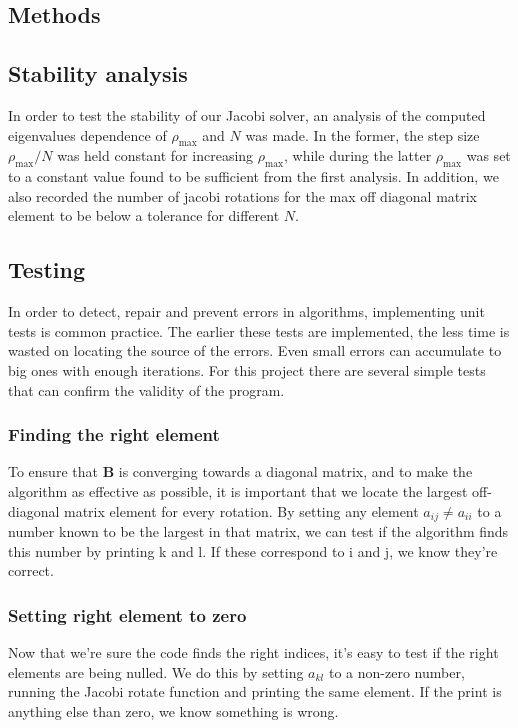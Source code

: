 \documentclass[10pt]{article}
\newcommand{\rhomax}{\rho_{\text{max}}}
\begin{document}
\begin{multicols}{2}
\section{Methods}
\subsection{Stability analysis}
In order to test the stability of our Jacobi solver, an analysis of the
computed eigenvalues dependence of $\rhomax$ and $N$ was made. In the
former, the step size $\rhomax/N$ was held constant for increasing
$\rhomax$, while during the latter $\rhomax$ was set to a constant value
found to be sufficient from the first analysis. In addition, we also
recorded the number of
jacobi rotations for the max off diagonal matrix element to be below a
tolerance for different $N$.

\subsection{Testing}
In order to detect, repair and prevent errors in algorithms, implementing
unit tests is common practice. The earlier these tests are implemented, the
less time is wasted on locating the source of the errors. Even small errors
can accumulate to big ones with enough iterations. For this project there
are several simple tests that can confirm the validity of the program.  

\subsubsection{Finding the right element}
To ensure that $\textbf{B}$ is converging towards a diagonal matrix, and to
make the algorithm as effective as possible, it is important that we locate
the largest off-diagonal matrix element for every rotation. By setting any
element $a_{ij}\neq a_{ii}$ to a number known to be the largest in that
matrix, we can test if the algorithm finds this number by printing k and l.
If these correspond to i and j, we know they're correct.

\subsubsection{Setting right element to zero}
Now that we're sure the code finds the right indices, it's easy to test if
the right elements are being nulled. We do this by setting $a_{kl}$ to a
non-zero number, running the Jacobi rotate function and printing the same
element. If the print is anything else than zero, we know something is
wrong.


\end{multicols}
\end{document}
